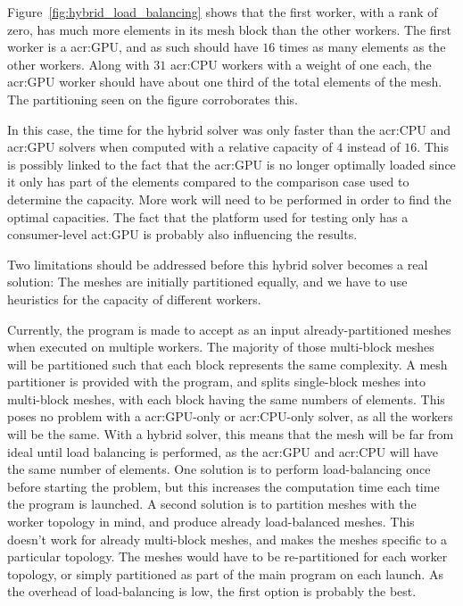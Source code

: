 Figure~\ref{fig:hybrid_load_balancing} shows that the first worker, with a rank of zero, has much
more elements in its mesh block than the other workers. The first worker is a \acrshort{acr:GPU},
and as such should have \(16\) times as many elements as the other workers. Along with \(31\)
\acrshort{acr:CPU} workers with a weight of one each, the \acrshort{acr:GPU} worker should have
about one third of the total elements of the mesh. The partitioning seen on the figure corroborates
this. 

In this case, the time for the hybrid solver was only faster than the \acrshort{acr:CPU} and
\acrshort{acr:GPU} solvers when computed with a relative capacity of \(4\) instead of \(16\). This
is possibly linked to the fact that the \acrshort{acr:GPU} is no longer optimally loaded since it
only has part of the elements compared to the comparison case used to determine the capacity. More
work will need to be performed in order to find the optimal capacities. The fact that the platform
used for testing only has a consumer-level \acrshort{act:GPU} is probably also influencing the
results. 

Two limitations should be addressed before this hybrid solver becomes a real solution: The meshes
are initially partitioned equally, and we have to use heuristics for the capacity of different
workers. 

Currently, the program is made to accept as an input already-partitioned meshes when executed on
multiple workers. The majority of those multi-block meshes will be partitioned such that each block
represents the same complexity. A mesh partitioner is provided with the program, and splits
single-block meshes into multi-block meshes, with each block having the same numbers of elements.
This poses no problem with a \acrshort{acr:GPU}-only or \acrshort{acr:CPU}-only solver, as all the
workers will be the same. With a hybrid solver, this means that the mesh will be far from ideal
until load balancing is performed, as the \acrshort{acr:GPU} and \acrshort{acr:CPU} will have the
same number of elements. One solution is to perform load-balancing once before starting the problem,
but this increases the computation time each time the program is launched. A second solution is to
partition meshes with the worker topology in mind, and produce already load-balanced meshes. This
doesn't work for already multi-block meshes, and makes the meshes specific to a particular topology.
The meshes would have to be re-partitioned for each worker topology, or simply partitioned as part
of the main program on each launch. As the overhead of load-balancing is low, the first option is
probably the best.

